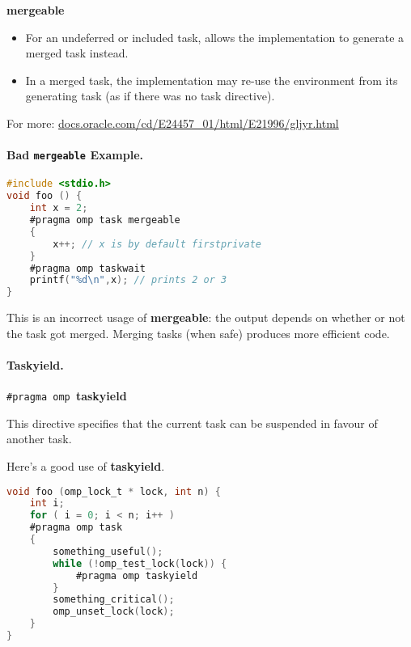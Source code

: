 \begin{center}
  {\bf mergeable}
\end{center}

  \begin{itemize}
    \item For an undeferred or included task,
    allows the implementation to generate a merged task instead.
    \item In a merged task, the implementation may re-use the environment from its generating task (as if there was no task directive).
  \end{itemize}

  For more: \url{docs.oracle.com/cd/E24457_01/html/E21996/gljyr.html}

\paragraph{Bad {\tt mergeable} Example.}

  \begin{lstlisting}[language=C]
#include <stdio.h>
void foo () {
    int x = 2;
    #pragma omp task mergeable
    {
        x++; // x is by default firstprivate
    }
    #pragma omp taskwait
    printf("%d\n",x); // prints 2 or 3
}
  \end{lstlisting}
  
    This is an incorrect usage of {\bf mergeable}: the output depends
      on whether or not the task got merged.
    Merging tasks (when safe) produces more efficient code.

\paragraph{Taskyield.}

  \begin{center}
    {\tt \#pragma omp }{\bf taskyield}
  \end{center}

This directive specifies that the current task can be suspended in favour of another task.

  Here's a good use of {\bf taskyield}.

  \begin{lstlisting}[language=C]
void foo (omp_lock_t * lock, int n) {
    int i;
    for ( i = 0; i < n; i++ )
    #pragma omp task
    {
        something_useful();
        while (!omp_test_lock(lock)) {
            #pragma omp taskyield
        }
        something_critical();
        omp_unset_lock(lock);
    }
}
  \end{lstlisting}

